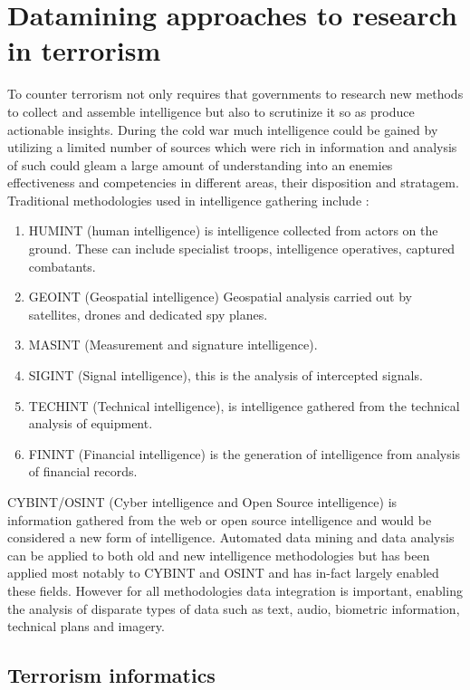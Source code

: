 \chapter[Datamining approaches to research in terrorism]{Datamining approaches to research in terrorism}

To counter terrorism not only requires that governments to research new methods to collect and assemble intelligence but also to scrutinize it so as produce actionable insights. During the cold war much intelligence could be gained by utilizing a limited number of sources which were rich in information and analysis of such could gleam a large amount of understanding into an enemies effectiveness and competencies in different areas, their disposition and stratagem. Traditional methodologies used in intelligence gathering include \citep{tanner2014examining}:
\begin{enumerate}
\item HUMINT (human intelligence) is intelligence collected from actors on the ground. These can include specialist troops, intelligence operatives, captured combatants.
\item GEOINT (Geospatial intelligence) Geospatial analysis carried out by satellites, drones and dedicated spy planes.
\item MASINT (Measurement and signature intelligence).
\item SIGINT (Signal intelligence), this is the analysis of intercepted signals.
\item TECHINT (Technical intelligence), is intelligence gathered from the technical analysis of equipment.
\item FININT  (Financial intelligence) is the generation of intelligence from analysis of financial records.
\end{enumerate}
CYBINT/OSINT (Cyber intelligence and Open Source intelligence) \citep{csahinnew} is information gathered from the web or open source intelligence and would be considered a new form of intelligence. Automated data mining and data analysis can be applied to both old and new  intelligence methodologies but has been applied most notably to CYBINT and OSINT and has in-fact largely enabled these fields.
However for all methodologies data integration is important, enabling the analysis of disparate types of data such as text, audio, biometric information, technical plans and imagery.

\section{Terrorism informatics}

